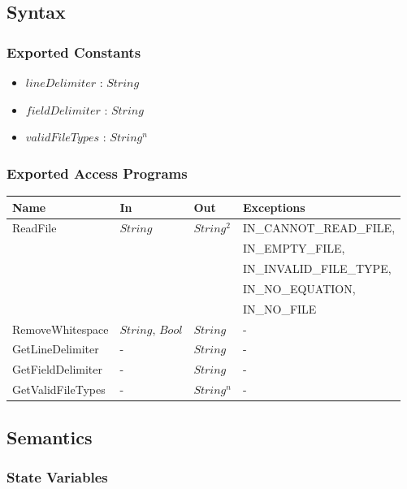 \documentclass[12pt, titlepage]{article}
\begin{document}
\subsection{Syntax}

\subsubsection{Exported Constants}

\begin{itemize}
	\item $lineDelimiter$ : $String$
	\item $fieldDelimiter$ : $String$
	\item $validFileTypes$ : $String^n$
\end{itemize}

\subsubsection{Exported Access Programs}

\begin{center}
	\begin{tabular}{p{3.2cm} p{3cm} p{3cm} p{5cm}}
		\hline
		\textbf{Name} & \textbf{In} & \textbf{Out} & \textbf{Exceptions} \\
		\hline
		\multirow{5}{3.2cm}{ReadFile} & \multirow{5}{3cm}{$String$} & 
		\multirow{5}{3cm}{$String^2$} & IN\_CANNOT\_READ\_FILE, \\
		 &  &  & IN\_EMPTY\_FILE, \\
		 & & & IN\_INVALID\_FILE\_TYPE,\\
		 & & &  IN\_NO\_EQUATION,\\
		 & & & IN\_NO\_FILE\\
		 RemoveWhitespace & $String$, $Bool$ & $String$ & - \\
		 GetLineDelimiter & - & $String$ & - \\
		 GetFieldDelimiter & - & $String$ & - \\
		 GetValidFileTypes & - & $String^n$ & - \\
		\hline
	\end{tabular}
\end{center}

\subsection{Semantics}

\subsubsection{State Variables}
\end{document}
